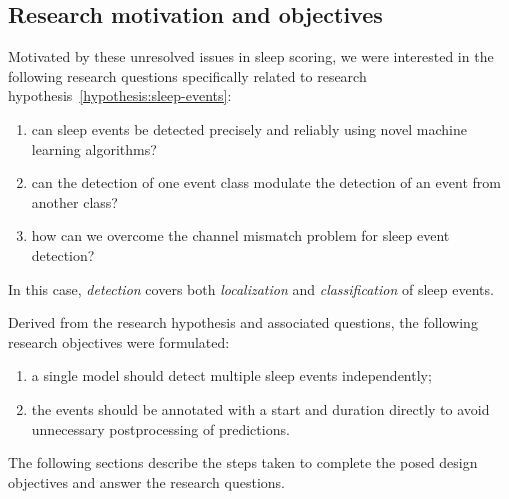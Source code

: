 \subsection{Research motivation and objectives}

Motivated by these unresolved issues in sleep scoring, we were interested in the following research questions specifically related to research hypothesis~\ref{hypothesis:sleep-events}\graffito{\ref{hypothesis:sleep-events}: \hypothesis\xspace sleep events.}:
\newcommand{\questionSleepEventsDetection}{can sleep events be detected precisely and reliably using novel machine learning algorithms}
\newcommand{\questionSleepEventsJointly}{can the detection of one event class modulate the detection of an event from another class}
\newcommand{\questionSleepEventsTransfer}{how can we overcome the channel mismatch problem for sleep event detection}
\begin{enumerate}[label={\footnotesize\bfseries\scshape RQ~2.\arabic*}, ref={\bfseries\scshape RQ~2.\arabic*}]
    \item \questionSleepEventsDetection\label{question:sleep-events-detection}?
    \item \questionSleepEventsJointly\label{question:sleep-events-jointly}?
    \item \questionSleepEventsTransfer\label{question:sleep-events-transfer}?
\end{enumerate}
In this case, \textit{detection} covers both \textit{localization} and \textit{classification} of sleep events.



Derived from the research hypothesis and associated questions, the following research objectives were formulated:

\begin{enumerate}[label=(\roman*)]
    \item a single model should detect multiple sleep events independently;
    \item the events should be annotated with a start and duration directly to avoid unnecessary postprocessing of predictions.
\end{enumerate}

The following sections describe the steps taken to complete the posed design objectives and answer the research questions.

\clearpage
\clearpage
\clearpage
\clearpage